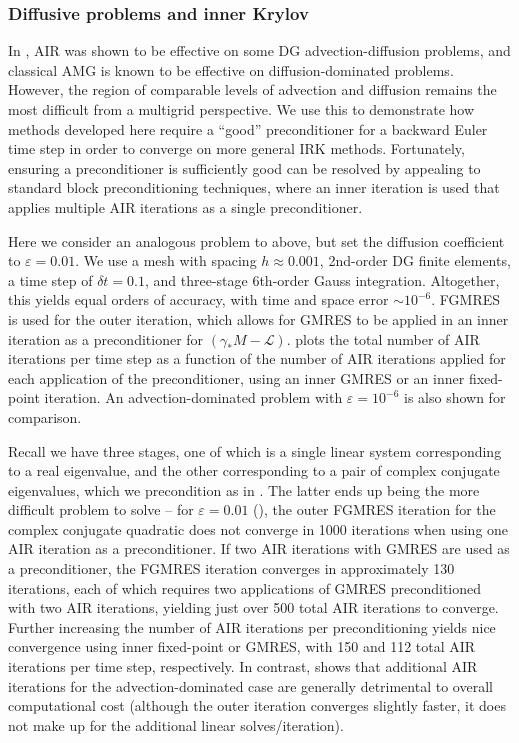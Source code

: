 \documentclass[review]{siamart}
\begin{document}
\subsubsection{Diffusive problems and inner Krylov}\label{sec:numerics:dg:diff}

In \cite{Manteuffel:2019}, AIR was shown to be effective on some DG advection-diffusion
problems, and classical AMG is known to be effective on diffusion-dominated
problems. However, the region of comparable levels of advection and diffusion
remains the most difficult from a multigrid perspective. We use this to
demonstrate how methods developed here require a ``good'' preconditioner
for a backward Euler time step in order to converge on more general IRK
methods. Fortunately, ensuring a preconditioner is sufficiently good can be
resolved by appealing to standard block preconditioning techniques, where an inner
iteration is used that applies multiple AIR iterations as a single preconditioner.

Here we consider an analogous problem to above, but set the diffusion coefficient
to $\varepsilon = 0.01$. We use a mesh with spacing $h \approx 0.001$, 2nd-order
DG finite elements, a time step of $\delta t = 0.1$, and three-stage 6th-order
Gauss integration. Altogether, this yields equal orders of accuracy, with time and
space error $\sim10^{-6}$. FGMRES \cite{saad1993flexible} is used for the
outer iteration, which allows for GMRES to be applied in an inner iteration
as a preconditioner for $(\gamma_* M - \mathcal{L})$.  plots the
total number of AIR iterations per time step as a function of the number of
AIR iterations applied for each application of the preconditioner, using an
inner GMRES or an inner fixed-point iteration. An advection-dominated problem
with $\varepsilon = 10^{-6}$ is also shown for comparison.

Recall we have three stages, one of which is a single linear system corresponding
to a real eigenvalue, and the other corresponding to a pair of complex conjugate
eigenvalues, which we precondition as in . The latter ends up being
the more difficult problem to solve -- for $\varepsilon =0.01$ (),
the outer FGMRES iteration for the complex conjugate quadratic does not converge in
1000 iterations when using one AIR iteration as a preconditioner.
If two AIR iterations with GMRES are used as a preconditioner,
the FGMRES iteration converges in approximately 130 iterations, each of which
requires two applications of GMRES preconditioned with two AIR iterations,
yielding just over 500 total AIR iterations to converge. Further increasing
the number of AIR iterations per preconditioning yields nice convergence
using inner fixed-point or GMRES, with 150 and 112 total AIR iterations per
time step, respectively. In contrast,  shows that
additional AIR iterations for the advection-dominated case are generally
detrimental to overall computational cost (although the outer iteration
converges slightly faster, it does not make up for the additional linear
solves/iteration).
\end{document}
